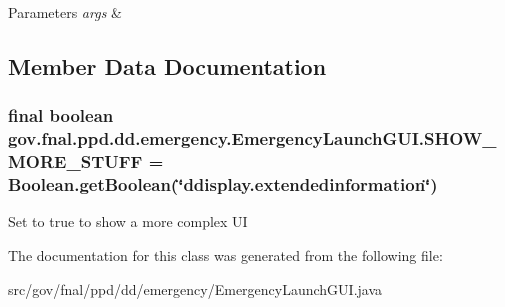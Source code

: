 \begin{DoxyParams}{Parameters}
{\em args} & \\
\hline
\end{DoxyParams}


\subsection{Member Data Documentation}
\hypertarget{classgov_1_1fnal_1_1ppd_1_1dd_1_1emergency_1_1EmergencyLaunchGUI_a38b676d30b6ac1c12dbc4b790f93b729}{
\subsubsection[{S\-H\-O\-W\-\_\-\-M\-O\-R\-E\-\_\-\-S\-T\-U\-F\-F}]{\setlength{\rightskip}{0pt plus 5cm}final boolean gov.\-fnal.\-ppd.\-dd.\-emergency.\-Emergency\-Launch\-G\-U\-I.\-S\-H\-O\-W\-\_\-\-M\-O\-R\-E\-\_\-\-S\-T\-U\-F\-F = Boolean.\-get\-Boolean(\char`\"{}ddisplay.\-extendedinformation\char`\"{})\hspace{0.3cm}{\ttfamily [static]}}}\label{classgov_1_1fnal_1_1ppd_1_1dd_1_1emergency_1_1EmergencyLaunchGUI_a38b676d30b6ac1c12dbc4b790f93b729}
Set to true to show a more complex U\-I 

The documentation for this class was generated from the following file\-:\begin{DoxyCompactItemize}
\item 
src/gov/fnal/ppd/dd/emergency/Emergency\-Launch\-G\-U\-I.\-java\end{DoxyCompactItemize}

